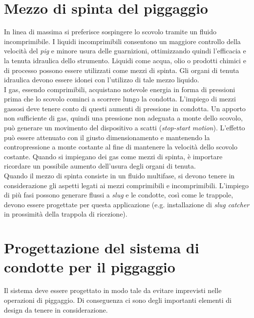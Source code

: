 \section{Mezzo di spinta del piggaggio}
In linea di massima si preferisce sospingere lo scovolo tramite un fluido incomprimibile. I liquidi incomprimibili consentono un maggiore controllo della velocità del \textit{pig} e minore usura delle guarnizioni, ottimizzando quindi l'efficacia e la tenuta idraulica dello strumento. Liquidi come acqua, olio o prodotti chimici e di processo possono essere utilizzati come mezzi di spinta. Gli organi di tenuta idraulica devono essere idonei con l'utilizzo di tale mezzo liquido.\\
I gas, essendo comprimibili, acquistano notevole energia in forma di pressioni prima che lo scovolo cominci a scorrere lungo la condotta. L'impiego di mezzi gassosi deve tenere conto di questi aumenti di pressione in condotta. Un apporto non sufficiente di gas, quindi una pressione non adeguata a monte dello scovolo,  può generare un movimento del dispositivo a scatti (\textit{stop-start motion}). L'effetto può essere attenuato con il giusto dimensionamento e mantenendo la contropressione a monte costante al fine di mantenere la velocità dello scovolo costante. Quando si impiegano dei gas come mezzi di spinta, è importare ricordare un possibile aumento dell'usura degli organi di tenuta. \\
Quando il mezzo di spinta consiste in un fluido multifase, si devono tenere in considerazione gli aspetti legati ai mezzi comprimibili e incomprimibili. L'impiego di più fasi possono generare flussi a \textit{slug} e le condotte, così come le trappole, devono essere progettate per questa applicazione (e.g. installazione di \textit{slug catcher} in prossimità della trappola di ricezione).


\section{Progettazione del sistema di condotte per il piggaggio}
Il sistema deve essere progettato in modo tale da evitare imprevisti nelle operazioni di piggaggio. Di conseguenza ci sono degli importanti elementi di design da tenere in considerazione.
